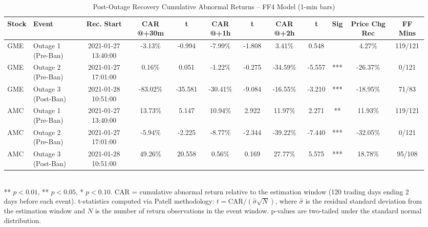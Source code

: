\begin{table}[htbp]
  \centering
  \caption{Post-Outage Recovery Cumulative Abnormal Returns -- FF4 Model (1-min bars)}
  \label{tab:ff4_recovery}
  \begin{tabular}{llcccccccccc}
    \hline\hline
    Stock & Event & Rec. Start & CAR @+30m & t & CAR @+1h & t & CAR @+2h & t & Sig & Price Chg Rec & FF Mins \\
    \hline
    GME & Outage 1 (Pre-Ban) & 2021-01-27 13:40:00 & -3.13\% & -0.994 & -7.99\% & -1.808 & 3.41\% & 0.548 &  & 4.27\% & 119/121 \\
    GME & Outage 2 (Pre-Ban) & 2021-01-27 17:01:00 & 0.16\% & 0.051 & -1.22\% & -0.275 & -34.59\% & -5.557 & *** & -26.37\% & 0/121 \\
    GME & Outage 3 (Post-Ban) & 2021-01-28 10:51:00 & -83.02\% & -35.581 & -30.41\% & -9.084 & -16.55\% & -3.210 & *** & -18.95\% & 71/83 \\
    \hline
    AMC & Outage 1 (Pre-Ban) & 2021-01-27 13:40:00 & 13.73\% & 5.147 & 10.94\% & 2.922 & 11.97\% & 2.271 & ** & 11.93\% & 119/121 \\
    AMC & Outage 2 (Pre-Ban) & 2021-01-27 17:01:00 & -5.94\% & -2.225 & -8.77\% & -2.344 & -39.22\% & -7.440 & *** & -32.05\% & 0/121 \\
    AMC & Outage 3 (Post-Ban) & 2021-01-28 10:51:00 & 49.26\% & 20.558 & 0.56\% & 0.169 & 27.77\% & 5.575 & *** & 18.78\% & 95/108 \\
    \hline\hline
  \end{tabular}
  \\[4pt]
  {\small *** $p<0.01$, ** $p<0.05$, * $p<0.10$. CAR = cumulative abnormal return relative to the estimation window (120 trading days ending 2 days before each event). t-statistics computed via Patell methodology: $t = \text{CAR} / (\hat{\sigma} \sqrt{N})$, where $\hat{\sigma}$ is the residual standard deviation from the estimation window and $N$ is the number of return observations in the event window. p-values are two-tailed under the standard normal distribution.}
\end{table}
